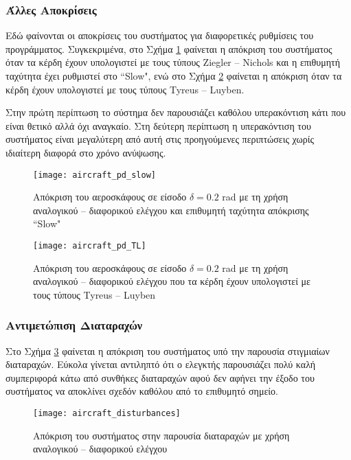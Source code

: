 \subsubsection{Άλλες Αποκρίσεις}

Εδώ φαίνονται οι αποκρίσεις του συστήματος για διαφορετικές ρυθμίσεις του προγράμματος. Συγκεκριμένα, στο Σχήμα \ref{fig:aircraft_pd_slow} φαίνεται η απόκριση του συστήματος όταν τα κέρδη έχουν υπολογιστεί με τους τύπους Ziegler -- Nichols και η επιθυμητή ταχύτητα έχει ρυθμιστεί στο ``Slow", ενώ στο Σχήμα \ref{fig:aircraft_pd_TL} φαίνεται η απόκριση όταν τα κέρδη έχουν υπολογιστεί με τους τύπους Tyreus -- Luyben.

Στην πρώτη περίπτωση το σύστημα δεν παρουσιάζει καθόλου υπερακόντιση κάτι που είναι θετικό αλλά όχι αναγκαίο. Στη δεύτερη περίπτωση η υπερακόντιση του συστήματος είναι μεγαλύτερη από αυτή στις προηγούμενες περιπτώσεις χωρίς ιδιαίτερη διαφορά στο χρόνο ανύψωσης.

\begin{figure}[h]
  \centering
  \texttt{[image: aircraft\_pd\_slow]}
  \caption{Απόκριση του αεροσκάφους σε είσοδο $\delta = 0.2$ rad με τη χρήση αναλογικού -- διαφορικού ελέγχου και επιθυμητή ταχύτητα απόκρισης ``Slow"}
  \label{fig:aircraft_pd_slow}
\end{figure}

\begin{figure}[h]
  \centering
  \texttt{[image: aircraft\_pd\_TL]}
  \caption{Απόκριση του αεροσκάφους σε είσοδο $\delta = 0.2$ rad με τη χρήση αναλογικού -- διαφορικού ελέγχου που τα κέρδη έχουν υπολογιστεί με τους τύπους Tyreus -- Luyben}
  \label{fig:aircraft_pd_TL}
\end{figure}

\subsubsection{Αντιμετώπιση Διαταραχών}

Στο Σχήμα \ref{fig:aircraft_disturbances} φαίνεται η απόκριση του συστήματος υπό την παρουσία στιγμιαίων διαταραχών. Εύκολα γίνεται αντιληπτό ότι ο ελεγκτής παρουσιάζει πολύ καλή συμπεριφορά κάτω από συνθήκες διαταραχών αφού δεν αφήνει την έξοδο του συστήματος να αποκλίνει σχεδόν καθόλου από το επιθυμητό σημείο.

\begin{figure}[h]
  \centering
  \texttt{[image: aircraft\_disturbances]}
  \caption{Απόκριση του συστήματος στην παρουσία διαταραχών με χρήση αναλογικού -- διαφορικού ελέγχου}
  \label{fig:aircraft_disturbances}
\end{figure}

